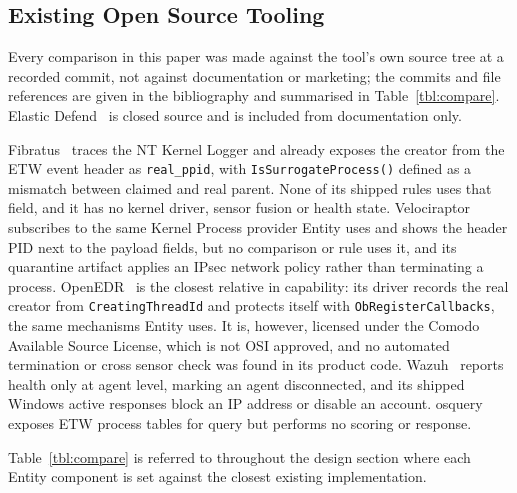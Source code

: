 \documentclass[10pt,twocolumn,letterpaper]{article}
\newcommand{\code}[1]{\texttt{\small #1}}
\begin{document}
\subsection{Existing Open Source Tooling}

Every comparison in this paper was made against the tool's own source tree at a recorded
commit, not against documentation or marketing; the commits and file references are
given in the bibliography and summarised in Table~\ref{tbl:compare}. Elastic
Defend~\cite{elastic} is closed source and is included from documentation only.

Fibratus~\cite{fibratus} traces the NT Kernel Logger and already exposes the creator
from the ETW event header as \code{real\_ppid}, with \code{IsSurrogateProcess()}
defined as a mismatch between claimed and real parent. None of its shipped rules uses
that field, and it has no kernel driver, sensor fusion or health state.
Velociraptor~\cite{velociraptor} subscribes to the same Kernel Process provider Entity
uses and shows the header PID next to the payload fields, but no comparison or rule uses
it, and its quarantine artifact applies an IPsec network policy rather than terminating
a process. OpenEDR~\cite{openedr} is the closest relative in capability: its driver
records the real creator from \code{CreatingThreadId} and protects itself with
\code{ObRegisterCallbacks}, the same mechanisms Entity uses. It is, however, licensed
under the Comodo Available Source License, which is not OSI approved, and no automated
termination or cross sensor check was found in its product code. Wazuh~\cite{wazuh}
reports health only at agent level, marking an agent disconnected, and its shipped
Windows active responses block an IP address or disable an account. osquery~\cite{osquery}
exposes ETW process tables for query but performs no scoring or response.

Table~\ref{tbl:compare} is referred to throughout the design section where each Entity
component is set against the closest existing implementation.
\end{document}
